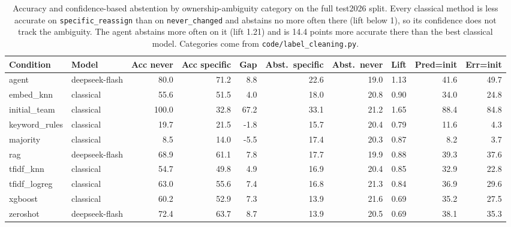\begin{table}[t]\centering
\caption{Accuracy and confidence-based abstention by ownership-ambiguity category on the full test2026 split. Every classical method is less accurate on \texttt{specific\_reassign} than on \texttt{never\_changed} and abstains no more often there (lift below 1), so its confidence does not track the ambiguity. The agent abstains more often on it (lift 1.21) and is 14.4 points more accurate there than the best classical model. Categories come from \texttt{code/label\_cleaning.py}.}
\label{tab:ambiguity-test2026}
\begin{tabular}{llrrrrrrrr}
\toprule
Condition & Model & Acc never & Acc specific & Gap & Abst.\ specific & Abst.\ never & Lift & Pred=init & Err=init \\
\midrule
agent & deepseek-flash & 80.0 & 71.2 & 8.8 & 22.6 & 19.0 & 1.13 & 41.6 & 49.7 \\
embed\_knn & classical & 55.6 & 51.5 & 4.0 & 18.0 & 20.8 & 0.90 & 34.0 & 24.8 \\
initial\_team & classical & 100.0 & 32.8 & 67.2 & 33.1 & 21.2 & 1.65 & 88.4 & 84.8 \\
keyword\_rules & classical & 19.7 & 21.5 & -1.8 & 15.7 & 20.4 & 0.79 & 11.6 & 4.3 \\
majority & classical & 8.5 & 14.0 & -5.5 & 17.4 & 20.3 & 0.87 & 8.2 & 3.7 \\
rag & deepseek-flash & 68.9 & 61.1 & 7.8 & 17.7 & 19.9 & 0.88 & 39.3 & 37.6 \\
tfidf\_knn & classical & 54.7 & 49.8 & 4.9 & 16.9 & 20.4 & 0.85 & 32.9 & 22.8 \\
tfidf\_logreg & classical & 63.0 & 55.6 & 7.4 & 16.8 & 21.3 & 0.84 & 36.9 & 29.6 \\
xgboost & classical & 60.2 & 52.9 & 7.3 & 13.9 & 21.6 & 0.69 & 35.2 & 27.5 \\
zeroshot & deepseek-flash & 72.4 & 63.7 & 8.7 & 13.9 & 20.5 & 0.69 & 38.1 & 35.3 \\
\bottomrule
\end{tabular}
\end{table}
